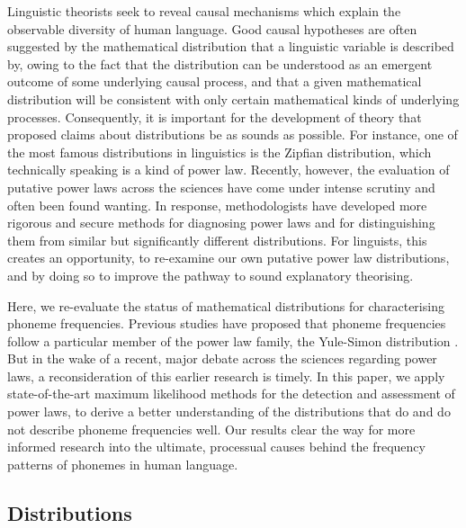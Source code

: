 Linguistic theorists seek to reveal causal mechanisms which explain the observable diversity of human language. Good causal hypotheses are often suggested by the mathematical distribution that a linguistic variable is described by, owing to the fact that the distribution can be understood as an emergent outcome of some underlying causal process, and that a given mathematical distribution will be consistent with only certain mathematical kinds of underlying processes. Consequently, it is important for the development of theory that proposed claims about distributions be as sounds as possible. For instance, one of the most famous distributions in linguistics is the Zipfian distribution, which technically speaking is a kind of power law. Recently, however, the evaluation of putative power laws across the sciences have come under intense scrutiny and often been found wanting. In response, methodologists have developed more rigorous and secure methods for diagnosing power laws and for distinguishing them from similar but significantly different distributions. For linguists, this creates an opportunity, to re-examine our own putative power law distributions, and by doing so to improve the pathway to sound explanatory theorising.

Here, we re-evaluate the status of mathematical distributions for characterising phoneme frequencies. Previous studies have proposed that phoneme frequencies follow a particular member of the power law family, the Yule-Simon distribution \autocites{martindale_comparison_1996}{tambovtsev_phoneme_2007}. But in the wake of a recent, major debate across the sciences regarding power laws, a reconsideration of this earlier research is timely. In this paper, we apply state-of-the-art maximum likelihood methods for the detection and assessment of power laws, to derive a better understanding of the distributions that do and do not describe phoneme frequencies well. Our results clear the way for more informed research into the ultimate, processual causes behind the frequency patterns of phonemes in human language.

\hypertarget{distributions}{%
\subsection{Distributions}\label{distributions}}

